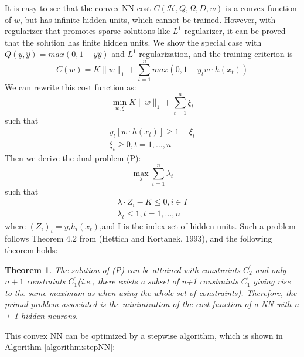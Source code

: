 \documentclass{article}
\renewcommand{\algorithmicrequire}{\textbf{Input:}}
\begin{document}
It is easy to see that the convex NN cost $C(\mathcal{H}, Q, \Omega, D, w)$ is a convex function of $w$, but has infinite hidden units, which cannot be trained. However, with regularizer that promotes sparse solutions like $L^{1}$ regularizer, it can be proved that the solution has finite hidden units. We show the special case with $Q(y,\hat{y}) = max(0, 1-y\hat{y})$ and $L^{1}$ regularization, and the training criterion is 
\begin{equation}
C(w) = K\lVert w \rVert_{1} + \sum_{t=1}^{n}max(0, 1-y_{t}w\cdot h(x_{t}))
\end{equation}
We can rewrite this cost function as:
\begin{equation}
\min_{w, \xi} K \lVert w \rVert_{1} + \sum_{t=1}^{n} \xi_{t}
\end{equation}
such that
\begin{gather}
y_{t}[w\cdot h(x_{t})] \ge 1 - \xi_{t}\\
\xi_{t} \ge 0, t=1,...,n
\end{gather}
Then we derive the dual problem (P):
\begin{equation}
\max_{\lambda} \sum_{t=1}^{n} \lambda_{t}
\end{equation}
such that
\begin{gather}
\lambda \cdot Z_{i} - K \le 0, i \in I\\
\lambda_{t} \le 1, t=1,...,n
\end{gather}
where $(Z_{i})_{t}= y_{t}h_{i}(x_{t})$,and I is the index set of hidden units. Such a problem follows Theorem 4.2 from (Hettich and Kortanek, 1993), and the following theorem holds:
\newtheorem{tem}{Theorem}[section]
\begin{tem}
	The solution of (P) can be attained with constraints $C_{2}^{'}$ and only $n + 1$ constraints $C_{1}^{'}$(i.e., there exists a subset of n+1 constraints $C_{1}^{'}$ giving rise to the same maximum
	as when using the whole set of constraints). Therefore, the primal problem associated is the
	minimization of the cost function of a NN with n + 1 hidden neurons.
\end{tem}
This convex NN can be optimized by a stepwise algorithm, which is shown in Algorithm \ref{algorithm:stepNN}:
\renewcommand{\algorithmicrequire}{\textbf{Input:}}
\end{document}
